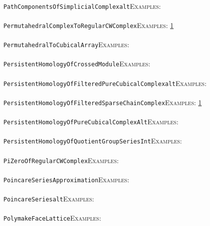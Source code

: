 \documentclass[a4paper,11pt]{report}
\begin{document}
{{ \\
 \texttt{PathComponentsOfSimplicialComplex{\textunderscore}alt}{\nobreakspace}{\nobreakspace}{\nobreakspace}{\nobreakspace}\textsc{Examples:} \\
 \\
 \texttt{PermutahedralComplexToRegularCWComplex}{\nobreakspace}{\nobreakspace}{\nobreakspace}{\nobreakspace}\textsc{Examples:} \href{../www/SideLinks/About/aboutPeripheral.html} {1}{\nobreakspace} \\
 \\
 \texttt{PermutahedralToCubicalArray}{\nobreakspace}{\nobreakspace}{\nobreakspace}{\nobreakspace}\textsc{Examples:} \\
 \\
 \texttt{PersistentHomologyOfCrossedModule}{\nobreakspace}{\nobreakspace}{\nobreakspace}{\nobreakspace}\textsc{Examples:} \\
 \\
 \texttt{PersistentHomologyOfFilteredPureCubicalComplex{\textunderscore}alt}{\nobreakspace}{\nobreakspace}{\nobreakspace}{\nobreakspace}\textsc{Examples:} \\
 \\
 \texttt{PersistentHomologyOfFilteredSparseChainComplex}{\nobreakspace}{\nobreakspace}{\nobreakspace}{\nobreakspace}\textsc{Examples:} \href{../www/SideLinks/About/aboutPersistent.html} {1}{\nobreakspace} \\
 \\
 \texttt{PersistentHomologyOfPureCubicalComplex{\textunderscore}Alt}{\nobreakspace}{\nobreakspace}{\nobreakspace}{\nobreakspace}\textsc{Examples:} \\
 \\
 \texttt{PersistentHomologyOfQuotientGroupSeries{\textunderscore}Int}{\nobreakspace}{\nobreakspace}{\nobreakspace}{\nobreakspace}\textsc{Examples:} \\
 \\
 \texttt{PiZeroOfRegularCWComplex}{\nobreakspace}{\nobreakspace}{\nobreakspace}{\nobreakspace}\textsc{Examples:} \\
 \\
 \texttt{PoincareSeriesApproximation}{\nobreakspace}{\nobreakspace}{\nobreakspace}{\nobreakspace}\textsc{Examples:} \\
 \\
 \texttt{PoincareSeries{\textunderscore}alt}{\nobreakspace}{\nobreakspace}{\nobreakspace}{\nobreakspace}\textsc{Examples:} \\
 \\
 \texttt{PolymakeFaceLattice}{\nobreakspace}{\nobreakspace}{\nobreakspace}{\nobreakspace}\textsc{Examples:} \\
}}
\end{document}
